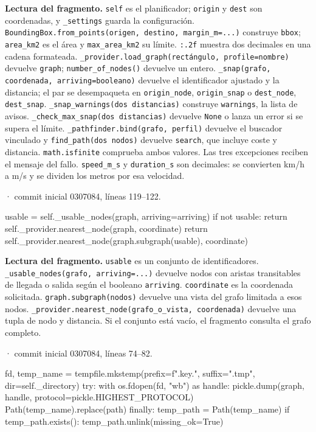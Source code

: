 \documentclass[11pt,a4paper]{article}
\begin{document}
\textbf{Lectura del fragmento.} \texttt{self} es el planificador; \texttt{origin} y \texttt{dest} son coordenadas, y \texttt{\_settings} guarda la configuración. \texttt{BoundingBox.from\_points(origen, destino, margin\_m=...)} construye \texttt{bbox}; \texttt{area\_km2} es el área y \texttt{max\_area\_km2} su límite. \texttt{:.2f} muestra dos decimales en una cadena formateada. \texttt{\_provider.load\_graph(rectángulo, profile=nombre)} devuelve \texttt{graph}; \texttt{number\_of\_nodes()} devuelve un entero. \texttt{\_snap(grafo, coordenada, arriving=booleano)} devuelve el identificador ajustado y la distancia; el par se desempaqueta en \texttt{origin\_node}, \texttt{origin\_snap} o \texttt{dest\_node}, \texttt{dest\_snap}. \texttt{\_snap\_warnings(dos distancias)} construye \texttt{warnings}, la lista de avisos. \texttt{\_check\_max\_snap(dos distancias)} devuelve \texttt{None} o lanza un error si se supera el límite. \texttt{\_pathfinder.bind(grafo, perfil)} devuelve el buscador vinculado y \texttt{find\_path(dos nodos)} devuelve \texttt{search}, que incluye coste y distancia. \texttt{math.isfinite} comprueba ambos valores. Las tres excepciones reciben el mensaje del fallo. \texttt{speed\_m\_s} y \texttt{duration\_s} son decimales: se convierten km/h a m/s y se dividen los metros por esa velocidad.


\smallskip
{\footnotesize\texttt{} · commit inicial 0307084, líneas 119--122.}\par
\begin{Codigo}[firstnumber=119]
        usable = self._usable_nodes(graph, arriving=arriving)
        if not usable:
            return self._provider.nearest_node(graph, coordinate)
        return self._provider.nearest_node(graph.subgraph(usable), coordinate)
\end{Codigo}

\textbf{Lectura del fragmento.} \texttt{usable} es un conjunto de identificadores. \texttt{\_usable\_nodes(grafo, arriving=...)} devuelve nodos con aristas transitables de llegada o salida según el booleano \texttt{arriving}. \texttt{coordinate} es la coordenada solicitada. \texttt{graph.subgraph(nodos)} devuelve una vista del grafo limitada a esos nodos. \texttt{\_provider.nearest\_node(grafo\_o\_vista, coordenada)} devuelve una tupla de nodo y distancia. Si el conjunto está vacío, el fragmento consulta el grafo completo.


\smallskip
{\footnotesize\texttt{} · commit inicial 0307084, líneas 74--82.}\par
\begin{Codigo}[firstnumber=74]
        fd, temp_name = tempfile.mkstemp(prefix=f".{key}.", suffix=".tmp", dir=self._directory)
        try:
            with os.fdopen(fd, "wb") as handle:
                pickle.dump(graph, handle, protocol=pickle.HIGHEST_PROTOCOL)
            Path(temp_name).replace(path)
        finally:
            temp_path = Path(temp_name)
            if temp_path.exists():
                temp_path.unlink(missing_ok=True)
\end{Codigo}
\end{document}
